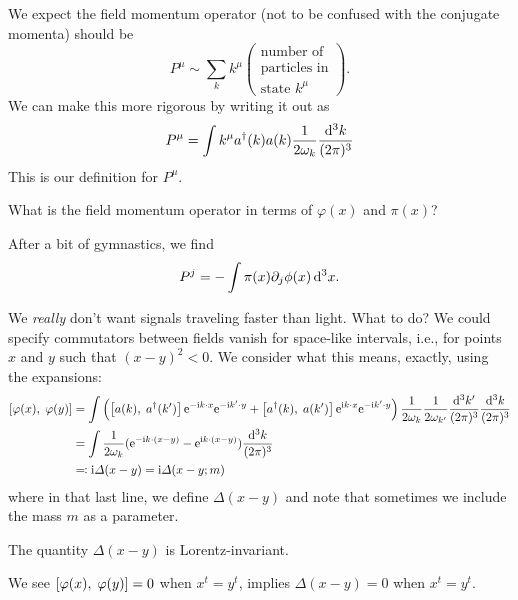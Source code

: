We expect the field momentum operator (not to be confused with the
conjugate momenta) should be
\begin{equation*}
P^{\mu}\sim\sum_{k} k^{\mu}
  \begin{pmatrix}\mbox{number of}\\
    \mbox{particles in}\\
    \mbox{state $k^{\mu}$}
  \end{pmatrix}.
\end{equation*}
We can make this more rigorous by writing it out as
\begin{equation}
P^{\mu} = \int k^{\mu}a^{\dagger}(k)a(k)\frac{1}{2\omega_{k}}\frac{\mathrm{d}^{3}k}{(2\pi)^{3}}
\end{equation}
This is our definition for $P^{\mu}$.

 What is the field momentum operator in terms of $\varphi(x)$
and $\pi(x)$?

 After a bit of gymnastics, we find
\begin{equation}
  P^{j} = -\int\pi(x)\partial_{j}\phi(x)\,\mathrm{d}^{3}x.
\end{equation}

We \emph{really} don't want signals traveling faster than light. What to
do? We could specify commutators between fields vanish for space-like
intervals, i.e., for points $x$ and $y$ such that $(x-y)^{2}<0$. We
consider what this means, exactly, using the expansions:
\begin{subequations}
  \begin{align}
    \left\lbrack\varphi(x),\;\varphi(y)\right\rbrack
    &= \int\left(\left\lbrack a(k),\;a^{\dagger}(k')\right\rbrack\mathrm{e}^{-\mathrm{i} k\cdot
      x}\mathrm{e}^{-\mathrm{i} k'\cdot y} + \left\lbrack a^{\dagger}(k),\;a(k')\right\rbrack\mathrm{e}^{\mathrm{i}
      k\cdot x}\mathrm{e}^{-\mathrm{i} k'\cdot
      y}\right)\frac{1}{2\omega_{k}}\frac{1}{2\omega_{k'}}\frac{\mathrm{d}^{3}k'}{(2\pi)^{3}}\frac{\mathrm{d}^{3}k}{(2\pi)^{3}}\\
&=\int\frac{1}{2\omega_{k}}(\mathrm{e}^{-\mathrm{i} k\cdot(x-y)}-\mathrm{e}^{\mathrm{i} k\cdot(x-y)})\frac{\mathrm{d}^{3}k}{(2\pi)^{3}}\\
&\eqqcolon \mathrm{i}\varDelta(x-y) = \mathrm{i}\varDelta(x-y; m)
  \end{align}
\end{subequations}
where in that last line, we define $\Delta(x-y)$ and note that sometimes
we include the mass $m$ as a parameter.

 The quantity $\Delta(x-y)$ is Lorentz-invariant.

We see $\left\lbrack\varphi(x),\;\varphi(y)\right\rbrack=0$ when $x^{t}=y^{t}$,
implies $\Delta(x-y)=0$ when $x^{t}=y^{t}$.

